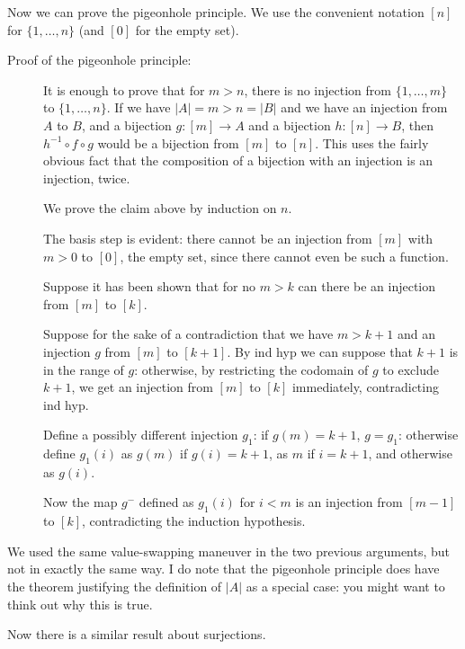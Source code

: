 \documentclass[12pt]{article}
\begin{document}
Now we can prove the pigeonhole principle.  We use the convenient notation $[n]$ for $\{1,\ldots,n\}$ (and $[0]$ for the empty set).

\begin{description}

\item[Proof of the pigeonhole principle:]  It is enough to prove that for $m>n$, there is no injection from
$\{1,\ldots,m\}$ to $\{1,\ldots,n\}$.  If we have $|A| = m > n = |B|$ and we have an injection from $A$ to $B$,
and a bijection $g:[m] \rightarrow A$ and a bijection $h:[n]\rightarrow B$, then $h^{-1}\circ f \circ g$ would be a bijection from $[m]$ to $[n]$.  This uses the fairly obvious fact that the composition of a bijection with an injection is an injection, twice.

We prove the claim above by induction on $n$.

The basis step is evident:  there cannot be an injection from $[m]$ with $m>0$ to $[0]$, the empty set, since there cannot even be such a function.

Suppose it has been shown that for no $m>k$ can there be an injection from $[m]$ to $[k]$.

Suppose for the sake of a contradiction that we have $m>k+1$ and an injection $g$ from $[m]$ to $[k+1]$.
By ind hyp we can suppose that $k+1$ is in the range of $g$:  otherwise, by restricting the codomain of $g$ to exclude $k+1$, we
get an injection from $[m]$ to $[k]$ immediately, contradicting ind hyp.

Define a possibly different injection $g_1$:  if $g(m)=k+1$, $g=g_1$:  otherwise define $g_1(i)$ as $g(m)$ if $g(i)=k+1$, as $m$ if $i=k+1$, and otherwise as $g(i)$.

Now the map $g^-$ defined as $g_1(i)$ for $i<m$ is an injection from $[m-1]$ to $[k]$, contradicting the induction hypothesis.

\end{description}

We used the same value-swapping maneuver in the two previous arguments, but not in exactly the same way.  I do note that the pigeonhole principle does have the theorem justifying the definition of $|A|$ as a special case:  you might want to think out why this is true.

Now there is a similar result about surjections.
\end{document}
